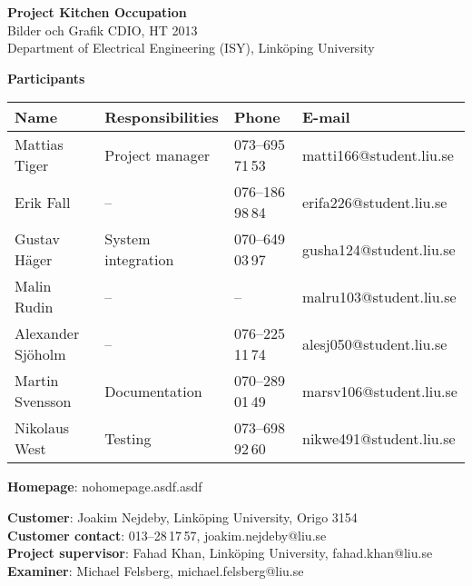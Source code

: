 \begin{center}
    \vspace*{4\baselineskip}

	\textbf{\huge Project Kitchen Occupation} \\
	\vspace*{0.5\baselineskip}
	Bilder och Grafik CDIO, HT 2013 \\
	Department of Electrical Engineering (ISY), Link\"{o}ping University
	
	\vspace*{2\baselineskip}
	\textbf{\LARGE Participants}


	{\footnotesize 
	\begin{tabular}{|p{2.7cm}|p{5cm}|p{2cm}|p{3.4cm}|}
		\hline
		\textbf{Name} & \textbf{Responsibilities} & \textbf{Phone} & \textbf{E-mail} \\
		\hline
		Mattias Tiger & Project manager & 073--695\,71\,53 & matti166@student.liu.se \\
		\hline
		Erik Fall & -- & 076--186\,98\,84 & erifa226@student.liu.se \\
		\hline
		Gustav Häger & System integration & 070--649\,03\,97 & gusha124@student.liu.se \\
		\hline
		Malin Rudin & -- & -- & malru103@student.liu.se \\
		\hline
		Alexander Sjöholm & -- & 076--225\,11\,74 & alesj050@student.liu.se \\
		\hline
		Martin Svensson & Documentation & 070--289\,01\,49 & marsv106@student.liu.se \\
		\hline
		Nikolaus West & Testing & 073--698\,92\,60 & nikwe491@student.liu.se \\
		\hline
	\end{tabular}
	}

{\footnotesize 
\vspace{0.5\baselineskip}
\textbf{Homepage}: nohomepage.asdf.asdf \\
\vspace{1\baselineskip}

\textbf{Customer}: Joakim Nejdeby, Link\"{o}ping University, Origo 3154 \\
\textbf{Customer contact}: 013--28\,17\,57, joakim.nejdeby@liu.se \\
\textbf{Project supervisor}: Fahad Khan, Link\"{o}ping University, fahad.khan@liu.se \\
\textbf{Examiner}: Michael Felsberg, michael.felsberg@liu.se \\
}

\end{center}
